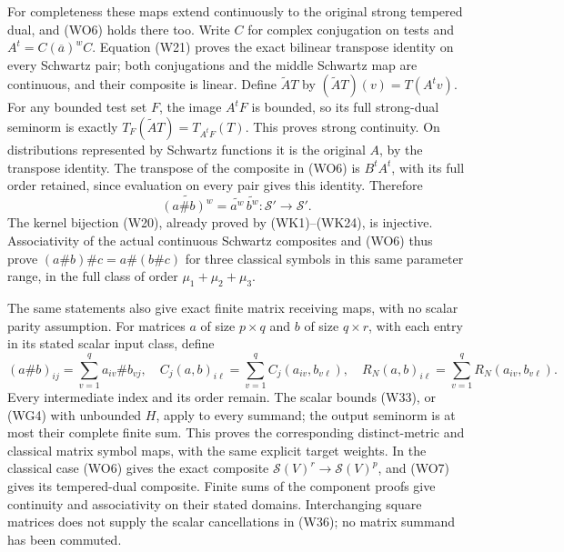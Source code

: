 \documentclass[
  11pt,
]{article}
\begin{document}
For completeness these maps extend continuously to the original strong
tempered dual, and (WO6) holds there too. Write \(C\) for complex
conjugation on tests and \(A^t=C(\overline a)^wC\). Equation (W21)
proves the exact bilinear transpose identity on every Schwartz pair;
both conjugations and the middle Schwartz map are continuous, and their
composite is linear. Define \(\widetilde A T\) by
\((\widetilde A T)(v)=T(A^tv)\). For any bounded test set \(F\), the
image \(A^tF\) is bounded, so its full strong-dual seminorm is exactly
\(T_F(\widetilde A T)=T_{A^tF}(T)\). This proves strong continuity. On
distributions represented by Schwartz functions it is the original
\(A\), by the transpose identity. The transpose of the composite in
(WO6) is \(B^tA^t\), with its full order retained, since evaluation on
every pair gives this identity. Therefore \[
 \widetilde{(a\#b)^w}=\widetilde{a^w}\,\widetilde{b^w}
                    :\mathcal S'\longrightarrow\mathcal S'.
 \tag{WO7}
\] The kernel bijection (W20), already proved by (WK1)--(WK24), is
injective. Associativity of the actual continuous Schwartz composites
and (WO6) thus prove \((a\#b)\#c=a\#(b\#c)\) for three classical symbols
in this same parameter range, in the full class of order
\(\mu_1+\mu_2+\mu_3\).

The same statements also give exact finite matrix receiving maps, with
no scalar parity assumption. For matrices \(a\) of size \(p\times q\)
and \(b\) of size \(q\times r\), with each entry in its stated scalar
input class, define \[
 (a\#b)_{ij}=\sum_{v=1}^q a_{iv}\#b_{vj},\quad
 C_j(a,b)_{i\ell}=\sum_{v=1}^q C_j(a_{iv},b_{v\ell}),\quad
 R_N(a,b)_{i\ell}=\sum_{v=1}^q R_N(a_{iv},b_{v\ell}).
 \tag{WO8}
\] Every intermediate index and its order remain. The scalar bounds
(W33), or (WG4) with unbounded \(H\), apply to every summand; the output
seminorm is at most their complete finite sum. This proves the
corresponding distinct-metric and classical matrix symbol maps, with the
same explicit target weights. In the classical case (WO6) gives the
exact composite \(\mathcal S(V)^r\to\mathcal S(V)^p\), and (WO7) gives
its tempered-dual composite. Finite sums of the component proofs give
continuity and associativity on their stated domains. Interchanging
square matrices does not supply the scalar cancellations in (W36); no
matrix summand has been commuted.
\end{document}
